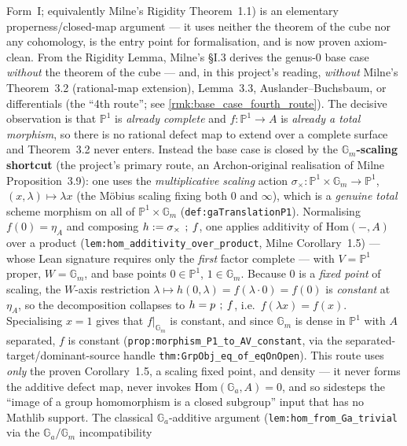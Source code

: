 Form~I; equivalently Milne's Rigidity Theorem~1.1) is an elementary properness/closed-map
argument --- it uses neither the theorem of the cube nor any cohomology, is the entry point
for formalisation, and is now proven axiom-clean. From the Rigidity Lemma, Milne's \S I.3
derives the genus-\(0\) base case \emph{without} the theorem of the cube --- and, in this
project's reading, \emph{without} Milne's Theorem~3.2 (rational-map extension), Lemma~3.3,
Auslander--Buchsbaum, or differentials (the ``4th route''; see
\cref{rmk:base_case_fourth_route}). The decisive observation is that \(\mathbb P^1\) is
\emph{already complete} and \(f \colon \mathbb P^1 \to A\) is \emph{already a total morphism}, so
there is no rational defect map to extend over a complete surface and Theorem~3.2 never enters.
Instead the base case is closed by the \textbf{\(\mathbb G_m\)-scaling shortcut} (the project's
primary route, an Archon-original realisation of Milne Proposition~3.9): one uses the
\emph{multiplicative scaling} action \(\sigma_\times \colon \mathbb P^1 \times \mathbb G_m \to
\mathbb P^1\), \((x, \lambda) \mapsto \lambda x\) (the M\"obius scaling fixing both \(0\) and
\(\infty\)), which is a \emph{genuine total} scheme morphism on all of \(\mathbb P^1 \times \mathbb
G_m\) (\texttt{def:gaTranslationP1}). Normalising \(f(0) = \eta_A\) and composing \(h := \sigma_\times
\fatsemi f\), one applies additivity of \(\mathrm{Hom}(-, A)\) over a product
(\texttt{lem:hom_additivity_over_product}, Milne Corollary~1.5) --- whose Lean signature requires
only the \emph{first} factor complete --- with \(V = \mathbb P^1\) proper, \(W = \mathbb G_m\), and
base points \(0 \in \mathbb P^1\), \(1 \in \mathbb G_m\). Because \(0\) is a \emph{fixed point} of
scaling, the \(W\)-axis restriction \(\lambda \mapsto h(0, \lambda) = f(\lambda \cdot 0) = f(0)\) is
\emph{constant} at \(\eta_A\), so the decomposition collapses to \(h = p \fatsemi f\), i.e.\
\(f(\lambda x) = f(x)\). Specialising \(x = 1\) gives that \(f|_{\mathbb G_m}\) is constant, and since
\(\mathbb G_m\) is dense in \(\mathbb P^1\) with \(A\) separated, \(f\) is constant
(\texttt{prop:morphism_P1_to_AV_constant}, via the separated-target/dominant-source handle
\texttt{thm:GrpObj_eq_of_eqOnOpen}). This route uses \emph{only} the proven Corollary~1.5, a
scaling fixed point, and density --- it never forms the additive defect map, never invokes
\(\mathrm{Hom}(\mathbb G_a, A) = 0\), and so sidesteps the ``image of a group homomorphism is a
closed subgroup'' input that has no Mathlib support. The classical \(\mathbb G_a\)-additive
argument (\texttt{lem:hom_from_Ga_trivial} via the \(\mathbb G_a/\mathbb G_m\) incompatibility
